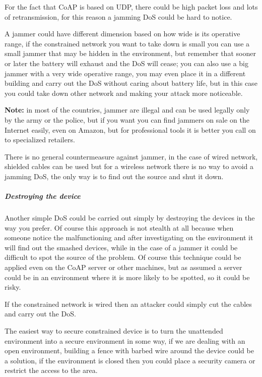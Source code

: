 	For the fact that CoAP is based on UDP, there could be high packet loss and lots of retransmission, for this reason a jamming DoS could be hard to notice.\newline
	
	A jammer could have different dimension based on how wide is its operative range, if the constrained network you want to take down is small you can use a small jammer that may be hidden in the environment, but remember that sooner or later the battery will exhaust and the DoS will cease; you can also use a big jammer with a very wide operative range, you may even place it in a different building and carry out the DoS without caring about battery life, but in this case you could take down other network and making your attack more noticeable.\newline
	
	\textbf{Note:} in most of the countries, jammer are illegal and can be used legally only by the army or the police, but if you want you can find jammers on sale on the Internet easily, even on Amazon, but for professional tools it is better you call on to specialized retailers.\newline
	
	There is no general countermeasure against jammer, in the case of wired network, shielded cables can be used but for a wireless network there is no way to avoid a jamming DoS, the only way is to find out the source and shut it down.\newline
	
	\subparagraph{Destroying the device}
	Another simple DoS could be carried out simply by destroying the devices in the way you prefer.\newline
	Of course this approach is not stealth at all because when someone notice the malfunctioning and after investigating on the environment it will find out the smashed devices, while in the case of a jammer it could be difficult to spot the source of the problem.\newline
	Of course this technique could be applied even on the CoAP server or other machines, but as assumed a server could be in an environment where it is more likely to be spotted, so it could be risky.\newline
	
	If the constrained network is wired then an attacker could simply cut the cables and carry out the DoS.\newline
	
	The easiest way to secure constrained device is to turn the unattended environment into a secure environment in some way, if we are dealing with an open environment, building a fence with barbed wire around the device could be a solution, if the environment is closed then you could place a security camera or restrict the access to the area.\newline
	
